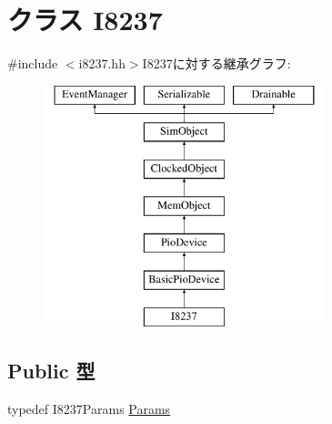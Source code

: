 \hypertarget{classX86ISA_1_1I8237}{
\section{クラス I8237}
\label{classX86ISA_1_1I8237}
}


{\ttfamily \#include $<$i8237.hh$>$}I8237に対する継承グラフ:\begin{figure}[H]
\begin{center}
\leavevmode
\includegraphics[height=7cm]{classX86ISA_1_1I8237}
\end{center}
\end{figure}
\subsection*{Public 型}
\begin{DoxyCompactItemize}
\item 
typedef I8237Params \hyperlink{classX86ISA_1_1I8237_a0e2ad01c52d44a915b5dd253a99ad175}{Params}
\end{DoxyCompactItemize}
